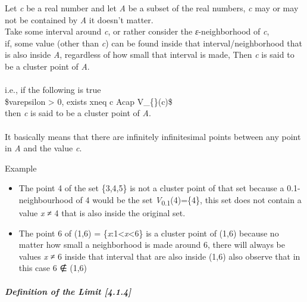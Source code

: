 \documentclass[]{article}
\let\oldsubparagraph\subparagraph
\renewcommand{\subparagraph}[1]{\oldsubparagraph{#1}\mbox{}}
\begin{document}
Let {\emph{c}} be a real number and let {\emph{A}} be a subset of the
real numbers, {\emph{c}} may or may not be contained by {\emph{A}} it
doesn't matter.\\
Take some interval around {\emph{c}}, or rather consider the
{\emph{ε}}-neighborhood of {\emph{c}},\\
if, some value (other than {\emph{c}}) can be found inside that
interval/neighborhood that is also inside {\emph{A}}, regardless of how
small that interval is made, Then {\emph{c}} is said to be a cluster
point of {\emph{A}}.\\
\hspace*{0.333em}\\
i.e., if the following is true\\
{\$\forall varepsilon \textgreater{} 0,
\enspace exists xneq c
\in Acap
V\_\{\varepsilon\}(c)\$}\\
then {\emph{c}} is said to be a cluster point of {\emph{A}}.\\
\hspace*{0.333em}\\
It basically means that there are infinitely infinitesimal points
between any point in {\emph{A}} and the value {\emph{c}}.

Example

\begin{itemize}
\item
  The point {4} of the set {\{3,4,5\}} is not a cluster point of that
  set because a 0.1-neighbourhood of 4 would be the set
  {\emph{V}\textsubscript{0.1}(4)=\{4\}}, this set does not contain a
  value {\emph{x} ≠ 4} that is also inside the original set.\\
\item
  The point 6 of {(1,6) = \{\emph{x}:1\textless{}\emph{x}\textless{}6\}}
  is a cluster point of {(1,6)} because no matter how small a
  neighborhood is made around 6, there will always be values
  {\emph{x} ≠ 6} inside that interval that are also inside {(1,6)} also
  observe that in this case {6 ∉ (1,6)}
\end{itemize}

\subparagraph{Definition of the Limit
{[}4.1.4{]}}\label{definition-of-the-limit-4.1.4}
\end{document}
